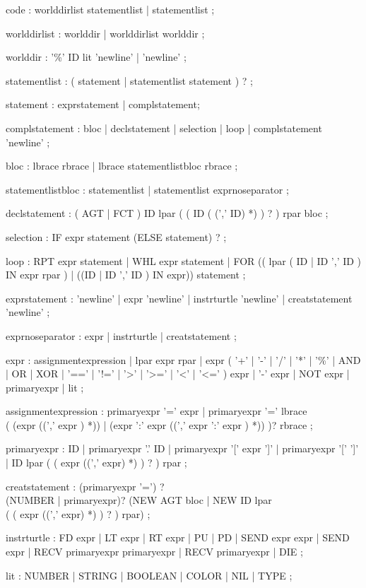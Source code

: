\begin{rail}
code : worlddirlist statementlist | statementlist ;

worlddirlist : worlddir
| worlddirlist worlddir
;

worlddir : '\%' ID lit 'newline' 
| 'newline'
;

statementlist : ( statement | statementlist statement ) ?
;

statement : exprstatement | complstatement;	

complstatement : bloc
| declstatement 
| selection 
| loop 
| complstatement 'newline'
;

bloc : lbrace rbrace 
| lbrace statementlistbloc rbrace 
; 

statementlistbloc : statementlist 
| statementlist exprnoseparator 
;

declstatement : ( AGT | FCT ) ID lpar ( ( ID ( (',' ID) *) ) ? ) rpar bloc 
;

selection : IF expr statement (ELSE statement) ? ;

loop : RPT expr statement
| WHL expr statement
| FOR (( lpar ( ID | ID ',' ID ) IN expr rpar ) | ((ID | ID ',' ID ) IN expr)) statement 
;

exprstatement : 'newline' 
| expr 'newline'
| instrturtle 'newline' 
| creatstatement 'newline'
;

exprnoseparator : expr 
| instrturtle
| creatstatement 
;

expr : assignmentexpression 
| lpar expr rpar
| expr ( '+' 
| '-' 
| '/' 
| '*' 
| '\%' 
| AND 
| OR 
| XOR 
| '==' 
| '!='
| '>'
| '>=' 
| '<'
| '<=' ) expr
| '-' expr 
| NOT expr
| primaryexpr
| lit 
;

assignmentexpression : primaryexpr '=' expr
| primaryexpr '=' lbrace \\ (
(expr ((',' expr ) *))
| (expr ':' expr ((',' expr ':' expr ) *))
)? rbrace
;

primaryexpr : ID
| primaryexpr '.' ID
| primaryexpr '[' expr ']'
| primaryexpr '[' ']'
| ID lpar ( ( expr ((',' expr) *) ) ? )  rpar
;

creatstatement : (primaryexpr '=') ? \\ (NUMBER | primaryexpr)? (NEW AGT bloc
| NEW ID lpar \\ ( ( expr ((',' expr) *) ) ? ) rpar)
;

instrturtle : FD expr
| LT expr
| RT expr
| PU
| PD
| SEND expr expr
| SEND expr
| RECV primaryexpr primaryexpr
| RECV primaryexpr
| DIE ;

lit : NUMBER 
| STRING 
| BOOLEAN 
| COLOR 
| NIL
| TYPE ;
\end{rail}


